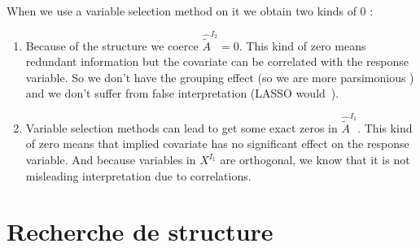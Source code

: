 \documentclass[12pt]{article}
\begin{document}
			When we use a variable selection method on it we obtain two kinds of 0 :
			\begin{enumerate}
			\item Because of the structure we coerce $\hat{\tilde{A}}^{I_2} = 0 $. This kind of zero means redundant information but the covariate can be correlated with the response variable. So we don't have the grouping effect (so we are more parsimonious ) and we don't suffer from false interpretation (LASSO would~\cite{Zhao2006MSC}).
			\item Variable selection methods can lead to get some exact zeros in $\hat{\tilde{A}}^{I_1}$. This kind of zero means that implied covariate has no significant effect on the response variable. And because variables in $X^{I_1}$ are orthogonal, we know that it is not misleading interpretation due to correlations.
			\end{enumerate}
\section{Recherche de structure}
	 	
\end{document}
